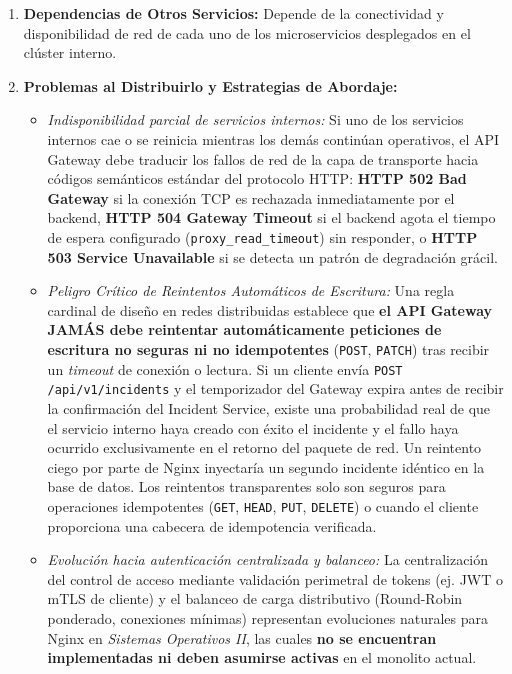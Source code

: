 \documentclass[10pt,a4paper]{article}
\begin{document}
\begin{enumerate}[leftmargin=*]
\begin{itemize}[leftmargin=*]
        \item \texttt{/health} $\longrightarrow$ Agregador de salud del clúster
    \end{itemize}
    \item \textbf{Dependencias de Otros Servicios:} Depende de la conectividad y disponibilidad de red de cada uno de los microservicios desplegados en el clúster interno.
    \item \textbf{Problemas al Distribuirlo y Estrategias de Abordaje:}
    \begin{itemize}[leftmargin=*]
        \item \textit{Indisponibilidad parcial de servicios internos:} Si uno de los servicios internos cae o se reinicia mientras los demás continúan operativos, el API Gateway debe traducir los fallos de red de la capa de transporte hacia códigos semánticos estándar del protocolo HTTP: \textbf{HTTP 502 Bad Gateway} si la conexión TCP es rechazada inmediatamente por el backend, \textbf{HTTP 504 Gateway Timeout} si el backend agota el tiempo de espera configurado (\texttt{proxy\_read\_timeout}) sin responder, o \textbf{HTTP 503 Service Unavailable} si se detecta un patrón de degradación grácil.
        \item \textit{Peligro Crítico de Reintentos Automáticos de Escritura:} Una regla cardinal de diseño en redes distribuidas establece que \textbf{el API Gateway JAMÁS debe reintentar automáticamente peticiones de escritura no seguras ni no idempotentes} (\texttt{POST}, \texttt{PATCH}) tras recibir un \textit{timeout} de conexión o lectura. Si un cliente envía \texttt{POST /api/v1/incidents} y el temporizador del Gateway expira antes de recibir la confirmación del Incident Service, existe una probabilidad real de que el servicio interno haya creado con éxito el incidente y el fallo haya ocurrido exclusivamente en el retorno del paquete de red. Un reintento ciego por parte de Nginx inyectaría un segundo incidente idéntico en la base de datos. Los reintentos transparentes solo son seguros para operaciones idempotentes (\texttt{GET}, \texttt{HEAD}, \texttt{PUT}, \texttt{DELETE}) o cuando el cliente proporciona una cabecera de idempotencia verificada.
        \item \textit{Evolución hacia autenticación centralizada y balanceo:} La centralización del control de acceso mediante validación perimetral de tokens (ej. JWT o mTLS de cliente) y el balanceo de carga distributivo (Round-Robin ponderado, conexiones mínimas) representan evoluciones naturales para Nginx en \textit{Sistemas Operativos II}, las cuales \textbf{no se encuentran implementadas ni deben asumirse activas} en el monolito actual.

\end{itemize}
\end{enumerate}
\end{document}
